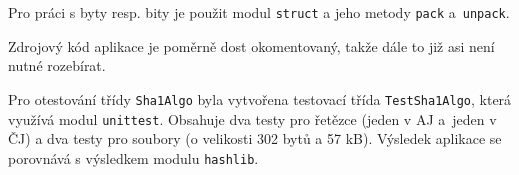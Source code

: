 \documentclass[a4paper]{article}
\begin{document}
Pro práci s byty resp. bity je použit modul \texttt{struct} a jeho metody \texttt{pack} a~\texttt{unpack}.

Zdrojový kód aplikace je poměrně dost okomentovaný, takže dále to již asi není nutné rozebírat.

Pro otestování třídy \texttt{Sha1Algo} byla vytvořena testovací třída \texttt{TestSha1Algo}, která využívá modul \texttt{unittest}. Obsahuje dva testy pro řetězce (jeden v AJ a~jeden v ČJ) a dva testy pro soubory (o velikosti 302 bytů a 57 kB). 
Výsledek aplikace se porovnává s výsledkem modulu \verb|hashlib|. 
\end{document}

